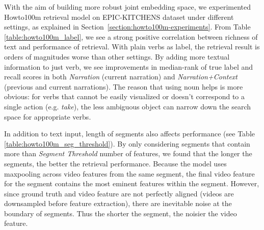 With the aim of building more robust joint embedding space, we experimented Howto100m retrieval model on EPIC-KITCHENS dataset under different settings, as explained in Section~\ref{section:howto100m-experiments}. From Table \ref{table:howto100m_label}, we see a strong positive correlation between richness of text and performance of retrieval. With plain verbs as label, the retrieval result is orders of magnitudes worse than other settings. By adding more textual information to just verb, we see improvements in median-rank of true label and recall scores in both \textit{Narration} (current narration) and \textit{Narration+Context} (previous and current narrations). The reason that using noun helps is more obvious: for verbs that cannot be easily visualized or doesn't correspond to a single action (e.g. \textit{take}), the less ambiguous object can narrow down the search space for appropriate verbs. 

In addition to text input, length of segments also affects performance (see Table \ref{table:howto100m_seg_threshold}). By only considering segments that contain more than \textit{Segment Threshold} number of features, we found that the longer the segments, the better the retrieval performance. Because the model uses maxpooling across video features from the same segment, the final video feature for the segment contains the most eminent features within the segment. However, since ground truth and video feature are not perfectly aligned (videos are downsampled before feature extraction), there are inevitable noise at the boundary of segments. Thus the shorter the segment, the noisier the video feature.   